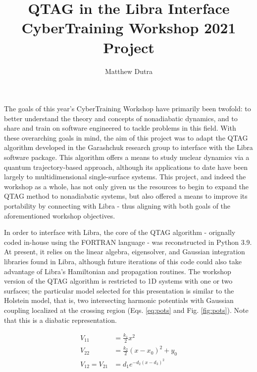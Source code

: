 \documentclass[journal=jpc]{achemso}
\title{QTAG in the Libra Interface\\
\large{CyberTraining Workshop 2021 Project}}
\author{Matthew Dutra}
\begin{document}
\maketitle

The goals of this year's CyberTraining Workshop have primarily been twofold: to better understand the theory and concepts of nonadiabatic dynamics, and to share and train on software engineered to tackle problems in this field. With these overarching goals in mind, the aim of this project was to adapt the QTAG algorithm developed in the Garashchuk research group to interface with the Libra software package. This algorithm offers a means to study nuclear dynamics via a quantum trajectory-based approach, although its applications to date have been largely to multidimensional single-surface systems. This project, and indeed the workshop as a whole, has not only given us the resources to begin to expand the QTAG method to nonadiabatic systems, but also offered a means to improve its portability by connecting with Libra - thus aligning with both goals of the aforementioned workshop objectives.

In order to interface with Libra, the core of the QTAG algorithm - orignally coded in-house using the FORTRAN language - was reconstructed in Python 3.9. At present, it relies on the linear algebra, eigensolver, and Gaussian integration libraries found in Libra, although future iterations of this code could also take advantage of Libra's Hamiltonian and propagation routines. The workshop version of the QTAG algorithm is restricted to 1D systems with one or two surfaces; the particular model selected for this presentation is similar to the Holstein model, that is, two intersecting harmonic potentials with Gaussian coupling localized at the crossing region (Eqs. \ref{eq:pots} and Fig. \ref{fig:pots}). Note that this is a diabatic representation.

\begin{align}\label{eq:pots}
V_{11} & =  \frac{k_1}{2}x^2 \nonumber \\
V_{22} & =  \frac{k_2}{2}(x-x_0)^2 + y_0\\
V_{12}=V_{21} & =  d_1e^{-d_2(x-d_3)^2} \nonumber
\end{align}
\end{document}
